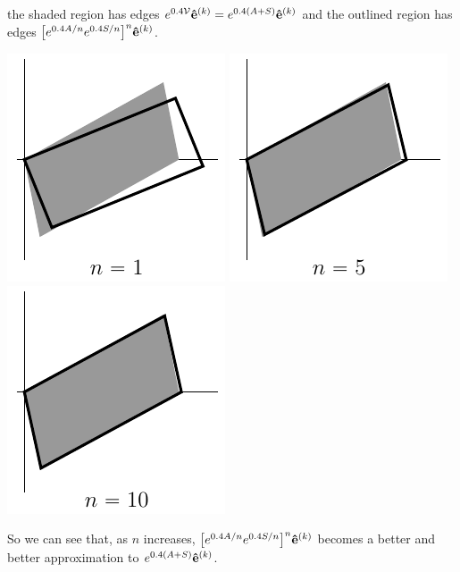 \begin{eg}[$\ \vv(x,y)= 2y\hi.$]
the shaded region has edges
$e^{0.4\mathcal{V}}\mathbf{\hat e}^{(k)}=e^{0.4(A+S)}\mathbf{\hat e}^{(k)}$ and the outlined region has edges 
$\big[e^{0.4A/n}e^{0.4S/n}\big]^{n}\mathbf{\hat e}^{(k)}$.
\begin{wfig}
\begin{center}
    \includegraphics{square6.pdf}\qquad
    \includegraphics{square7.pdf}\qquad
    \includegraphics{square8.pdf}
\end{center}
\end{wfig}
So we can see that, as $n$ increases, $\big[e^{0.4A/n}e^{0.4S/n}\big]^{n}\mathbf{\hat e}^{(k)}$
becomes a better and better approximation to $e^{0.4(A+S)}\mathbf{\hat e}^{(k)}$.

\end{eg}









